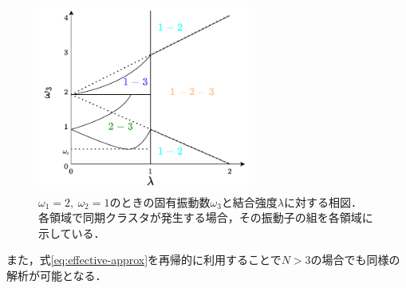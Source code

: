 \documentclass[../main]{subfiles}
\begin{document}
\begin{figure}[t]
\centering
\includegraphics[width=70mm]{./images/appendix-bifurcation.pdf}
\centering
\caption{$\omega_1=2,\ \omega_2=1$のときの固有振動数$\omega_3$と結合強度$\lambda$に対する相図．
各領域で同期クラスタが発生する場合，その振動子の組を各領域に示している．}
\label{fig:appendix-bifurcation}
\end{figure}
また，式\eqref{eq:effective-approx}を再帰的に利用することで$N>3$の場合でも同様の解析が可能となる．
\end{document}
